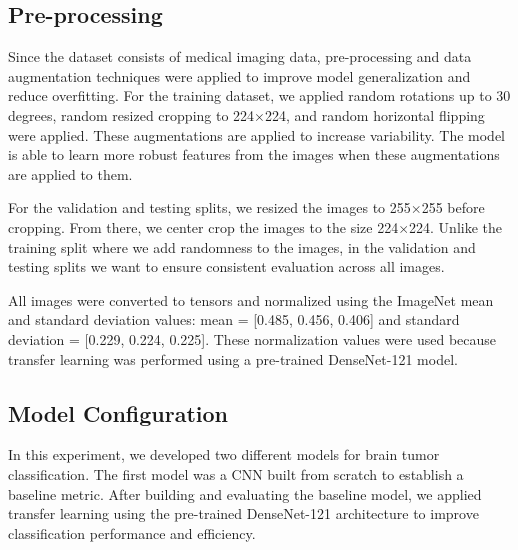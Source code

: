 \documentclass[conference]{IEEEtran}
\begin{document}
\subsection{Pre-processing}

Since the dataset consists of medical imaging data, pre-processing and data augmentation techniques were applied to improve model generalization and reduce overfitting. For the training dataset, we applied random rotations up to 30 degrees, random resized cropping to 224$\times$224, and random horizontal flipping were applied. These augmentations are applied to increase variability. The model is able to learn more robust features from the images when these augmentations are applied to them.

For the validation and testing splits, we resized the images to 255$\times$255 before cropping. From there, we center crop the images to the size 224$\times$224. Unlike the training split where we add randomness to the images, in the validation and testing splits we want to ensure consistent evaluation across all images.

All images were converted to tensors and normalized using the ImageNet mean and standard deviation values: mean = [0.485, 0.456, 0.406] and standard deviation = [0.229, 0.224, 0.225]. These normalization values were used because transfer learning was performed using a pre-trained DenseNet-121 model.

\subsection{Model Configuration}
In this experiment, we developed two different models for brain tumor classification. The first model was a CNN built from scratch to establish a baseline metric. After building and evaluating the baseline model, we applied transfer learning using the pre-trained DenseNet-121 architecture to improve classification performance and efficiency.
\end{document}
